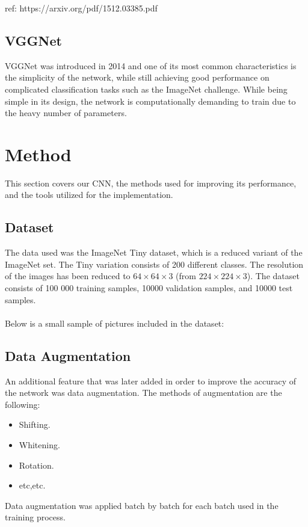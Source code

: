\documentclass{kthreport}
\begin{document}
ref:
https://arxiv.org/pdf/1512.03385.pdf

\subsection{VGGNet}
VGGNet was introduced in 2014 and one of its most common characteristics is the simplicity of the network, while still achieving good performance on complicated classification tasks such as the ImageNet challenge\cite{simonyan2014very}. While being simple in its design, the network is computationally demanding to train due to the heavy number of parameters.



\section{Method}
This section covers our CNN, the methods used for improving its performance, and the tools utilized for the implementation.

\subsection{Dataset}
The data used was the ImageNet Tiny dataset, which is a reduced variant of the ImageNet set. The Tiny variation consists of 200 different classes. The resolution of the images has been reduced to $64\times64\times3$ (from  $224\times224\times3$). The dataset consists of 100 000 training samples, 10000 validation samples, and 10000 test samples.
\\\\
Below is a small sample of pictures included in the dataset:

\FloatBarrier


\subsection{Data Augmentation}
An additional feature that was later added in order to improve the accuracy of the network was data augmentation. The methods of augmentation are the following:\\
\begin{itemize}
\item Shifting.
\item Whitening.
\item Rotation.
\item etc,etc.
\end{itemize}
Data augmentation was applied batch by batch for each batch used in the training process.
\end{document}
